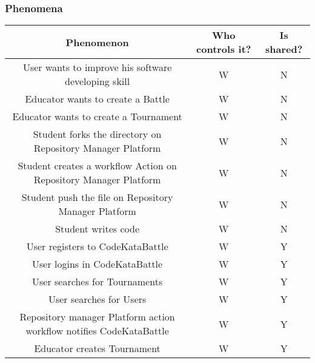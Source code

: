 \subsubsection{Phenomena}
\begin{center}
    \begin{table}[h]
        \begin{tabularx}{\textwidth}{| c| c| c|}
            \hline
            \rowcolor{blue!50}
            Phenomenon                                                            & Who controls it? & Is shared? \\
            \hline
            User wants to improve his software developing skill                   & W                & N          \\
            Educator wants to create a Battle                                     & W                & N          \\
            Educator wants to create a Tournament                                 & W                & N          \\
            Student forks the directory on Repository Manager Platform            & W                & N          \\
            Student creates a workflow Action on Repository Manager Platform      & W                & N          \\
            Student push the file on Repository Manager Platform                  & W                & N          \\
            Student writes code                                                   & W                & N          \\
            User registers to CodeKataBattle                                      & W                & Y          \\
            User logins in CodeKataBattle                                         & W                & Y          \\
            User searches for Tournaments                                         & W                & Y          \\
            User searches for Users                                               & W                & Y          \\
            Repository manager Platform action workflow notifies CodeKataBattle   & W                & Y          \\
            Educator creates Tournament                                           & W                & Y          \\

\end{tabularx}
\end{table}
\end{center}
